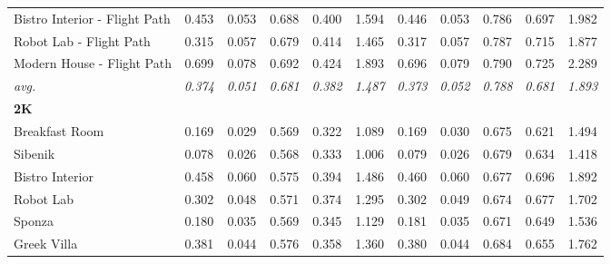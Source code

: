\begin{table*}
\begin{tabular}{lccccc|ccccc}
Bistro Interior - Flight Path & 0.453              & 0.053          & 0.688          & 0.400          & 1.594          & 0.446              & 0.053          & 0.786          & 0.697          & 1.982          \\
Robot Lab - Flight Path       & 0.315              & 0.057          & 0.679          & 0.414          & 1.465          & 0.317              & 0.057          & 0.787          & 0.715          & 1.877          \\
Modern House - Flight Path    & 0.699              & 0.078          & 0.692          & 0.424          & 1.893          & 0.696              & 0.079          & 0.790          & 0.725          & 2.289          \\
\hline
\textit{avg.}                 & \textit{0.374}     & \textit{0.051} & \textit{0.681} & \textit{0.382} & \textit{1.487} & \textit{0.373}     & \textit{0.052} & \textit{0.788} & \textit{0.681} & \textit{1.893} \\
\hline
\textbf{2K}  & & & & & & & & & & \\
Breakfast Room                & 0.169              & 0.029          & 0.569          & 0.322          & 1.089          & 0.169              & 0.030          & 0.675          & 0.621          & 1.494          \\
Sibenik                       & 0.078              & 0.026          & 0.568          & 0.333          & 1.006          & 0.079              & 0.026          & 0.679          & 0.634          & 1.418          \\
Bistro Interior               & 0.458              & 0.060          & 0.575          & 0.394          & 1.486          & 0.460              & 0.060          & 0.677          & 0.696          & 1.892          \\
Robot Lab                     & 0.302              & 0.048          & 0.571          & 0.374          & 1.295          & 0.302              & 0.049          & 0.674          & 0.677          & 1.702          \\
Sponza                        & 0.180              & 0.035          & 0.569          & 0.345          & 1.129          & 0.181              & 0.035          & 0.671          & 0.649          & 1.536          \\
Greek Villa                   & 0.381              & 0.044          & 0.576          & 0.358          & 1.360          & 0.380              & 0.044          & 0.684          & 0.655          & 1.762          \\

\end{tabular}
\end{table*}
